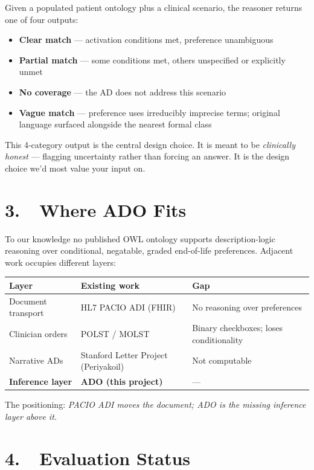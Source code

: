 \documentclass[11pt]{article}
\begin{document}
Given a populated patient ontology plus a clinical scenario, the reasoner returns one of four outputs:
\begin{itemize}
    \item \textbf{Clear match} --- activation conditions met, preference unambiguous
    \item \textbf{Partial match} --- some conditions met, others unspecified or explicitly unmet
    \item \textbf{No coverage} --- the AD does not address this scenario
    \item \textbf{Vague match} --- preference uses irreducibly imprecise terms; original language surfaced alongside the nearest formal class
\end{itemize}

This 4-category output is the central design choice. It is meant to be \emph{clinically honest} --- flagging uncertainty rather than forcing an answer. It is the design choice we'd most value your input on.

\section*{3.\ \ Where ADO Fits}

To our knowledge no published OWL ontology supports description-logic reasoning over conditional, negatable, graded end-of-life preferences. Adjacent work occupies different layers:

\begin{tabularx}{\textwidth}{lXX}
\toprule
\textbf{Layer} & \textbf{Existing work} & \textbf{Gap} \\
\midrule
Document transport & HL7 PACIO ADI (FHIR) & No reasoning over preferences \\
Clinician orders   & POLST / MOLST & Binary checkboxes; loses conditionality \\
Narrative ADs      & Stanford Letter Project (Periyakoil) & Not computable \\
\textbf{Inference layer} & \textbf{ADO (this project)} & --- \\
\bottomrule
\end{tabularx}

The positioning: \emph{PACIO ADI moves the document; ADO is the missing inference layer above it.}

\section*{4.\ \ Evaluation Status}
\end{document}
